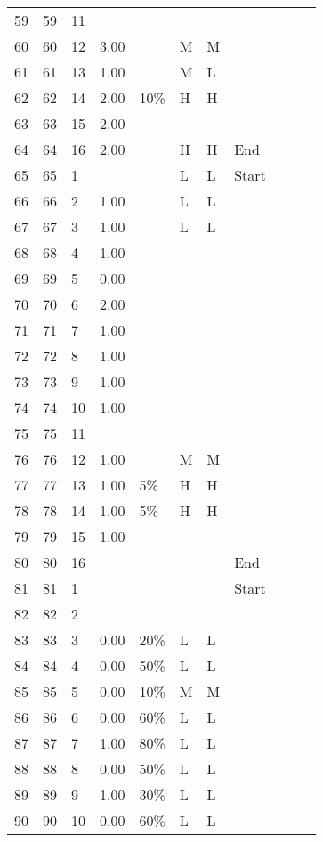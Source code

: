 \begin{longtable}{lllllllllll}
  59 &  59 &  11 &  &  &  &  &  \\ 
  60 &  60 &  12 & 3.00 &  & M & M &  \\ 
  61 &  61 &  13 & 1.00 &  & M & L &  \\ 
  62 &  62 &  14 & 2.00 & 10\% & H & H &  \\ 
  63 &  63 &  15 & 2.00 &  &  &  &  \\ 
  64 &  64 &  16 & 2.00 &  & H & H & End \\ 
  65 &  65 &   1 &  &  & L & L & Start \\ 
  66 &  66 &   2 & 1.00 &  & L & L &  \\ 
  67 &  67 &   3 & 1.00 &  & L & L &  \\ 
  68 &  68 &   4 & 1.00 &  &  &  &  \\ 
  69 &  69 &   5 & 0.00 &  &  &  &  \\ 
  70 &  70 &   6 & 2.00 &  &  &  &  \\ 
  71 &  71 &   7 & 1.00 &  &  &  &  \\ 
  72 &  72 &   8 & 1.00 &  &  &  &  \\ 
  73 &  73 &   9 & 1.00 &  &  &  &  \\ 
  74 &  74 &  10 & 1.00 &  &  &  &  \\ 
  75 &  75 &  11 &  &  &  &  &  \\ 
  76 &  76 &  12 & 1.00 &  & M & M &  \\ 
  77 &  77 &  13 & 1.00 & 5\% & H & H &  \\ 
  78 &  78 &  14 & 1.00 & 5\% & H & H &  \\ 
  79 &  79 &  15 & 1.00 &  &  &  &  \\ 
  80 &  80 &  16 &  &  &  &  & End \\ 
  81 &  81 &   1 &  &  &  &  & Start \\ 
  82 &  82 &   2 &  &  &  &  &  \\ 
  83 &  83 &   3 & 0.00 & 20\% & L & L &  \\ 
  84 &  84 &   4 & 0.00 & 50\% & L & L &  \\ 
  85 &  85 &   5 & 0.00 & 10\% & M & M &  \\ 
  86 &  86 &   6 & 0.00 & 60\% & L & L &  \\ 
  87 &  87 &   7 & 1.00 & 80\% & L & L &  \\ 
  88 &  88 &   8 & 0.00 & 50\% & L & L &  \\ 
  89 &  89 &   9 & 1.00 & 30\% & L & L &  \\ 
  90 &  90 &  10 & 0.00 & 60\% & L & L &  \\ 

\end{longtable}
